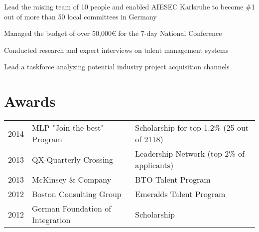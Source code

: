 \documentclass[letterpaper]{deedy-resume} %
\begin{document}
\begin{minipage}[t]{0.66\textwidth}
\begin{tightitemize}
\item Lead the raising team of 10 people and enabled AIESEC Karlsruhe to become \#1 out of more than 50 local committees in Germany
\item Managed the budget of over 50,000€ for the 7-day National Conference 
\end{tightitemize}

\sectionspace %



\begin{tightitemize}
\item Conducted research and expert interviews on talent management systems
\item Lead a taskforce analyzing potential industry project acquisition channels
\end{tightitemize}

\sectionspace %


\section{Awards} 

\begin{tabular}{rll}
2014	 & MLP "Join-the-best" Program & Scholarship for top 1.2\% (25 out of 2118)\\
2013	 & QX-Quarterly Crossing & Leadership Network (top 2\% of applicants)\\
2013	 & McKinsey \& Company & BTO Talent Program\\
2012	 & Boston Consulting Group & Emeralds Talent Program\\
2012	 & German Foundation of Integration & Scholarship\\
\end{tabular}

\sectionspace %



\end{minipage}
\end{document}
